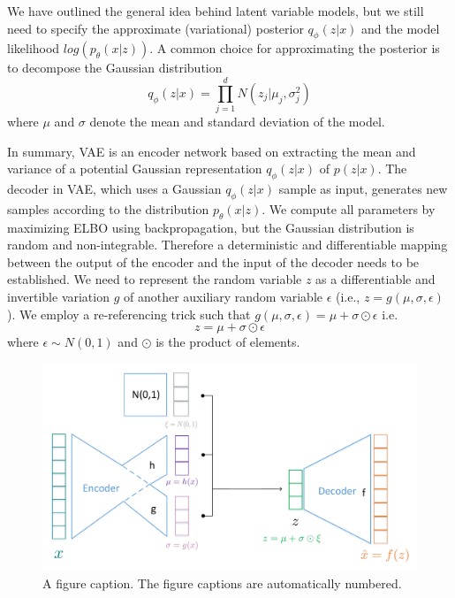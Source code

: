 \documentclass[%
reprint,
amsmath,amssymb,
aps,
]{revtex4-2}
\begin{document}
	We have outlined the general idea behind latent variable models, but we still need to specify the approximate (variational) posterior $q_{\phi}(z|x)$ and the model likelihood $log(p_{\theta}(x|z))$. A common choice for approximating the posterior is to decompose the Gaussian distribution
	\begin{equation}\label{prop}
		q_{\phi}(z|x) = \prod^d_{j=1} N(z_j|\mu_j,\sigma_j^2)
	\end{equation}
	where $\mu$ and $\sigma$ denote the mean and standard deviation of the model.
	
	In summary, VAE is an encoder network based on extracting the mean and variance of a potential Gaussian representation $q_{\phi}(z|x)$ of $p(z|x)$. The decoder in VAE, which uses a Gaussian $q_{\phi}(z|x)$ sample as input, generates new samples according to the distribution $p_{\theta}(x|z)$. We compute all parameters by maximizing ELBO using backpropagation, but the Gaussian distribution is random and non-integrable. Therefore a deterministic and differentiable mapping between the output of the encoder and the input of the decoder needs to be established. We need to represent the random variable $z$ as a differentiable and invertible variation $g$ of another auxiliary random variable $\epsilon$ (i.e., $z = g(\mu,\sigma,\epsilon)$). We employ a re-referencing trick such that $g(\mu,\sigma,\epsilon) = \mu + \sigma \odot \epsilon$ i.e.
	\begin{equation}\label{reparam}
		z  = \mu + \sigma \odot \epsilon
	\end{equation}
	where $\epsilon \sim N(0,1)$ and $\odot$ is the product of elements.
	
	\begin{figure}[b]
		\includegraphics[scale=0.3]{vae}
		\caption{\label{fig:epsart} A figure caption. The figure captions are automatically numbered.}
		\label{fig:vae}
	\end{figure}
	
\end{document}

